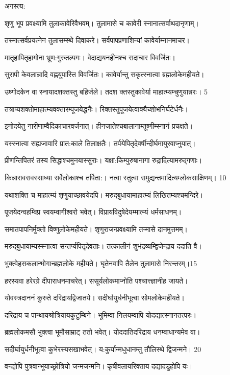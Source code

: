 अगस्त्य:

शृणु भूप प्रवक्ष्यामि तुलाकावेरिवैभवम्।
तुलामासे च कावेरी स्नानात्सर्वाथदानृणाम्।

तस्मात्सर्वप्रयत्नेन तुलासम्स्थे दिवाकरे।
सर्वपापप्रणाशिन्यां कावेर्याम्नानमाचर।

मातृहापितृहागोना भ्रूण:गुरुतल्पगः।
वेदाद्ययनहीनश्च सदाचार विवर्जितः।

सुरापी केवलान्नादि वह्नयुपास्ति विवर्जितः।
कावेर्यान्तु सकृत्स्नात्वा ब्रह्मलोकेमहीयते।

उष्णोदकेन वा स्नायादशक्तस्तु बहिर्जले।
तदश क्तस्तुकावेर्या माहात्म्यम्चुणुयान्नरः। 5

तत्राप्यशक्तोमाहात्म्यवक्तारम्पूजयेद्धनैः।
रिक्तस्तुपूजयेत्वाक्यैच्शोभनिर्घटेर्धनैः।

इनोदयेतु नारीणाम्वैदिकाचारवर्जनात्।
हीनजातेश्चबालानाम्तूष्णीम्स्नानं प्रचक्षते।

यस्स्नात्वा सह्यजावारि प्रात:काले तिलाक्षतैः।
तर्पयेपितृदेवर्षीन्दीर्घमायुरवाप्नुयात्।

प्रीणन्तिपितरं तस्य सिद्धाश्चमुनयास्सुराः।
यक्षा:किम्पुरुषानागा रुद्रादित्यामरुद्गणाः।

किन्नारावसवस्साध्या सर्वेलोकाश्च तर्पिता:।
नत्वा स्तुत्वा समुद्यन्तमादित्यम्लोकसाक्षिणम्। 10

यथाशक्ति च माहात्म्यं शृणुयाच्छावयेदपि।
मरुद्बुधायामाहात्म्यं लिखितम्यश्चमन्दिरे।

पूजयेदन्वहम्विप्र स्वयम्वागीश्वरो भवेत्।
विप्रायविदुषेदेयम्मात्म्यं धर्मसाधनम्।

समातपापनिर्मुक्तो विष्णुलोकेमहीयते।
शृणुराजन्प्रवक्ष्यामि तन्मासे दानमुत्तमम्।

मरुद्बुधायाम्यस्स्नात्वा सन्तर्प्यपितृदेवताः।
तत्कालीनं शुभंद्रव्यम्द्विजेन्द्राय ददाति वै।

भुक्त्वेहसकलान्भोगान्ब्रह्मलोके महीयते।
घृतेनवापि तैलेन तुलामासे निरन्तरम्।15

हरस्यवा हरेरग्रे दीपाराधनमाचरेत्।
ससूर्यलोकमाप्नोति पश्चात्त्ज्ञानीह जायते।

योवस्त्रदाननं कुरुते दरिद्रायद्विजातये।
सदीर्घायुर्धनीभूत्वा सोमलोकेमहीयते।

दरिद्राय च पान्थायश्रोत्रियायकुटुम्बिने।
भूमिम्वा निलयम्वापि योदद्यात्स्नानतत्परः।

ब्रह्मलोकमसौ भुक्त्वा भूमौसाम्राट् ततो भवेत्।
योददातिदरिद्राय धनम्वाधान्यमेव वा।

सदीर्घायुर्धनीभूत्वा कुभेरस्यसखाभवेत्।
य:कुर्यान्मधुधानम्तु तौलिस्थे द्विजन्मने। 20

वन्द्योपि पुत्रवान्भूयाच्छ्रोत्रियो जन्मजन्मनि।
कृषीवलायरिक्ताय दद्यादडुहोपि यः।


